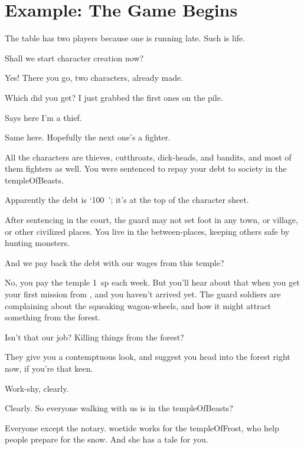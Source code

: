 \section{Example: The Game Begins}

\begin{multicols}{2}

\noindent
The table has two players because one is running late.
Such is life.


\begin{description}\sf
  \item[Player 1:]
  Shall we start character creation now?
  \item[\Glsentrytext{gm}:]
  Yes!
  There you go, two characters, already made.

  Which did you get?
  I just grabbed the first ones on the pile.
  \item[Player 2:]
  Says here I'm a thief.
  \item[Player 1:]
  Same here.
  Hopefully the next one's a fighter.
  \item[\Glsentrytext{gm}:]
  All the characters are thieves, cutthroats, dick-heads, and bandits, and most of them fighters as well.
  You were sentenced to repay your debt to society in the \gls{templeOfBeasts}.
  \item[Player 1:]
  Apparently the debt is `100~'; it's at the top of the character sheet.
  \item[\Gls{gm}:]
  After sentencing in the \gls{court}, the \gls{guard} may not set foot in any town, or \gls{village}, or other civilized places.
  You live in the between-places, keeping others safe by hunting \glspl{monster}.
  \item[Player 1:]
  And we pay back the debt with our wages from this \gls{temple}?
  \item[\Gls{gm}:]
  No, you pay the \gls{temple} 1~\gls{sp} each week.
  But you'll hear about that when you get your first mission from , and you haven't arrived yet.
  The \gls{guard} \glspl{soldier} are complaining about the squeaking wagon-wheels, and how it might attract something from the forest.
  \item[Player 2:]
  Isn't that our job?
  Killing things from the forest?
  \item[\Gls{gm}:]
  They give you a contemptuous look, and suggest you head into the forest right now, if you're that keen.
  \item[Player 2:]
  Work-shy, clearly.
  \item[Player 1:]
  Clearly.
  So everyone walking with us is in the \gls{templeOfBeasts}?
  \item[\Gls{gm}:]
  Everyone except the \gls{notary}.
  \Gls{woetide} works for the \gls{templeOfFrost}, who help people prepare for the snow.
  And she has a tale for you.


\end{description}
\end{multicols}
